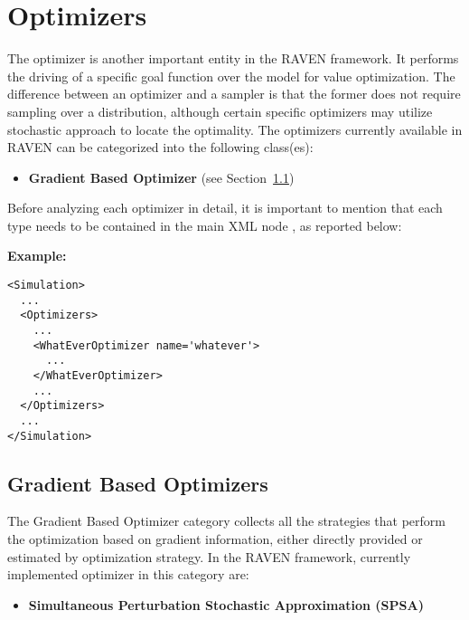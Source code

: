 \section{Optimizers}
\label{sec:Optimizers}

\renewcommand{\nameDescription}
{
  \xmlAttr{name},
  \xmlDesc{required string attribute}, user-defined name of this optimizer.
  \nb As with other objects, this identifier can be used to reference this
  specific entity from other input blocks in the XML.
}
\renewcommand{\specBlock}[2]
{
  The specifications of this optimizer must be defined within #1 \xmlNode{#2} XML
  block.
}


The optimizer is another important entity in the RAVEN framework. It performs the driving of a specific goal function over the model for value optimization. The difference between an optimizer and a sampler is that the former does not require sampling over a distribution, although certain specific optimizers may utilize stochastic approach to locate the optimality.
The optimizers currently available in RAVEN can be categorized into the following class(es):
\begin{itemize}
\item \textbf{Gradient Based Optimizer} (see Section~\ref{subsec:gradientBasedOptimizers})
\end{itemize}

Before analyzing each optimizer in detail, it is important to mention that each type needs to be contained in the main XML node , as reported below:

\textbf{Example:}

\begin{lstlisting}[style=XML]
<Simulation>
  ...
  <Optimizers>
    ...
    <WhatEverOptimizer name='whatever'>
      ...
    </WhatEverOptimizer>
    ...
  </Optimizers>
  ...
</Simulation>
\end{lstlisting}

\subsection{Gradient Based Optimizers}
\label{subsec:gradientBasedOptimizers}
The Gradient Based Optimizer category collects all the strategies that perform the optimization based on gradient information, either directly provided or estimated by optimization strategy. In the RAVEN framework, currently implemented optimizer in this category are:
\begin{itemize}
\item \textbf{Simultaneous Perturbation Stochastic Approximation (SPSA)}
\end{itemize}

